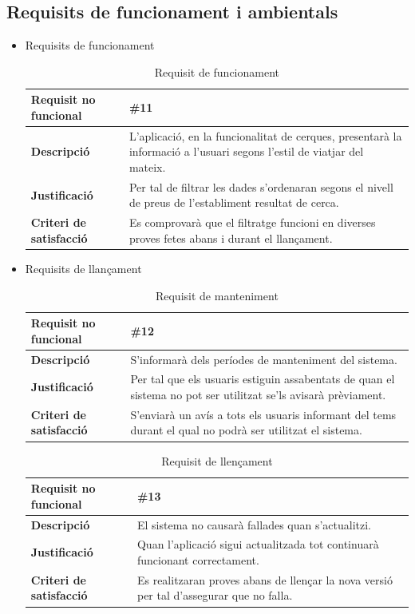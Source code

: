 \subsection{Requisits de funcionament i ambientals}
\begin{itemize}
\item{Requisits de funcionament}

\begin{table}[!h]
\begin{tabular}{|l|M|}
\hline
\textbf{Requisit no funcional }& \#11    \\ \hline
\textbf{Descripció} & L’aplicació, en la funcionalitat de cerques, presentarà la informació a l’usuari segons l’estil de viatjar del
mateix. \\ \hline
\textbf{Justificació} & Per tal de filtrar les dades s’ordenaran segons el nivell
de preus de l’establiment resultat de cerca. \\ \hline
\textbf{Criteri de satisfacció} & Es comprovarà que el filtratge funcioni en diverses proves fetes abans i durant el llançament. \\ \hline
\end{tabular}
\label{}
\caption{Requisit de funcionament}
\end{table}

\item{Requisits de llançament}

\begin{table}[!h]
\begin{tabular}{|l|M|}
\hline
\textbf{Requisit no funcional }& \#12    \\ \hline
\textbf{Descripció} & S’informarà dels períodes de manteniment del sistema. \\ \hline
\textbf{Justificació} & Per tal que els usuaris estiguin assabentats de quan el
sistema no pot ser utilitzat se’ls avisarà prèviament. \\ \hline
\textbf{Criteri de satisfacció} & S’enviarà un avís a tots els usuaris informant del tems durant el qual no podrà ser utilitzat el sistema. \\ \hline
\end{tabular}
\label{}
\caption{Requisit de manteniment}
\end{table}

\begin{table}[!h]
\begin{tabular}{|l|M|}
\hline
\textbf{Requisit no funcional }& \#13   \\ \hline
\textbf{Descripció} & El sistema no causarà fallades quan s’actualitzi.\\ \hline
\textbf{Justificació} & Quan l’aplicació sigui actualitzada tot continuarà
funcionant correctament. \\ \hline
\textbf{Criteri de satisfacció} & Es realitzaran proves abans de llençar la nova versió per tal d’assegurar que no falla.\\ \hline
\end{tabular}
\label{}
\caption{Requisit de llençament}
\end{table}


\end{itemize}

